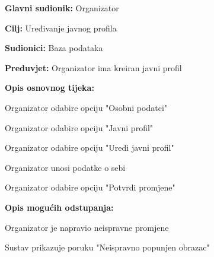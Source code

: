 					\noindent {}
					\begin{packed_item}
	
						\item \textbf{Glavni sudionik:} Organizator
						\item  \textbf{Cilj:} Uređivanje javnog profila
						\item  \textbf{Sudionici:} Baza podataka
						\item  \textbf{Preduvjet:} Organizator ima kreiran javni profil
						\item  \textbf{Opis osnovnog tijeka:}
						
						\item[] \begin{packed_enum}
	
							\item Organizator odabire opciju "Osobni podatci"
							\item Organizator odabire opciju "Javni profil"
							\item Organizator odabire opciju "Uredi javni profil"
							\item Organizator unosi podatke o sebi
							\item Organizator odabire opciju "Potvrdi promjene"
						\end{packed_enum}

						\item  \textbf{Opis mogućih odstupanja:}
						
						\item[] \begin{packed_item}
	
							\item[5.a] Organizator je napravio neispravne promjene
							\item[] \begin{packed_enum}
								
								\item Sustav prikazuje poruku "Neispravno popunjen obrazac"
								
							\end{packed_enum}
						\end{packed_item}
					\end{packed_item}

